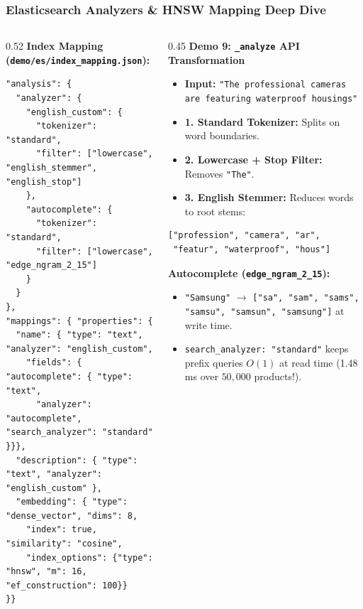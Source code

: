 \documentclass[aspectratio=169]{beamer}
\begin{document}
\begin{frame}[fragile]
\frametitle{Elasticsearch Analyzers \& HNSW Mapping Deep Dive}
\begin{columns}[T]
\begin{column}{0.52\textwidth}
\textbf{\scriptsize Index Mapping (\texttt{demo/es/index\_mapping.json}):}
\begin{lstlisting}
"analysis": {
  "analyzer": {
    "english_custom": {
      "tokenizer": "standard",
      "filter": ["lowercase", "english_stemmer", "english_stop"]
    },
    "autocomplete": {
      "tokenizer": "standard",
      "filter": ["lowercase", "edge_ngram_2_15"]
    }
  }
},
"mappings": { "properties": {
  "name": { "type": "text", "analyzer": "english_custom",
    "fields": { "autocomplete": { "type": "text",
      "analyzer": "autocomplete", "search_analyzer": "standard" }}},
  "description": { "type": "text", "analyzer": "english_custom" },
  "embedding": { "type": "dense_vector", "dims": 8,
    "index": true, "similarity": "cosine",
    "index_options": {"type": "hnsw", "m": 16, "ef_construction": 100}}
}}
\end{lstlisting}
\end{column}
\begin{column}{0.45\textwidth}
\textbf{\scriptsize Demo 9: \texttt{\_analyze} API Transformation}
\scriptsize
\begin{itemize}
    \item \textbf{Input:} \texttt{"The professional cameras are featuring waterproof housings"}
    \item \textbf{1. Standard Tokenizer:} Splits on word boundaries.
    \item \textbf{2. Lowercase + Stop Filter:} Removes \texttt{"The"}.
    \item \textbf{3. English Stemmer:} Reduces words to root stems:
\end{itemize}
\begin{lstlisting}
["profession", "camera", "ar",
 "featur", "waterproof", "hous"]
\end{lstlisting}
\textbf{\scriptsize Autocomplete (\texttt{edge\_ngram\_2\_15}):}
\scriptsize
\begin{itemize}
    \item \texttt{"Samsung"} $\rightarrow$ \texttt{["sa", "sam", "sams", "samsu", "samsun", "samsung"]} at write time.
    \item \texttt{search\_analyzer: "standard"} keeps prefix queries $O(1)$ at read time (1.48 ms over $50,000$ products!).
\end{itemize}
\end{column}
\end{columns}
\end{frame}
\end{document}
